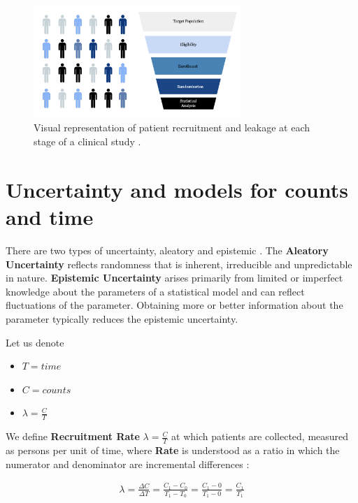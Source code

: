 \begin{figure}[h]
  \centering
  \includegraphics[width=0.7\textwidth]{fig_2_1_b.png}
  \caption{Visual representation of patient recruitment and leakage at each stage of a clinical study \citep{piantadosi2022principles, whelan2018high, bogin2022lasagna}.}
  \label{fig:2_1_b}
\end{figure}

\section{Uncertainty and models for counts and time}

There are two types of uncertainty, aleatory and epistemic \citep{ohagan2006}. The \textbf{Aleatory Uncertainty} reflects randomness that is inherent, irreducible and unpredictable in nature. \textbf{Epistemic Uncertainty} arises primarily from limited or imperfect knowledge about the parameters of a statistical model and can reflect fluctuations of the parameter. Obtaining more or better information about the parameter typically reduces the epistemic uncertainty. 


Let us denote

\begin{itemize}
\item $T=time$
\item $C=counts$
\item $\lambda=\frac{C}{T}$
\end{itemize}

We define \textbf{Recruitment Rate} $\lambda=\frac{C}{T}$ at which patients are collected, measured as persons per unit of time, where \textbf{Rate} is understood as a ratio in which the numerator and denominator are incremental differences \citep{piantadosi2024clinical}:

\begin{align*}
\lambda = \frac{\Delta C}{\Delta T} = \frac{C_1 - C_0}{T_1 - T_0} = \frac{C_1 - 0}{T_1 - 0} = \frac{C_1}{T_1}
\end{align*}


